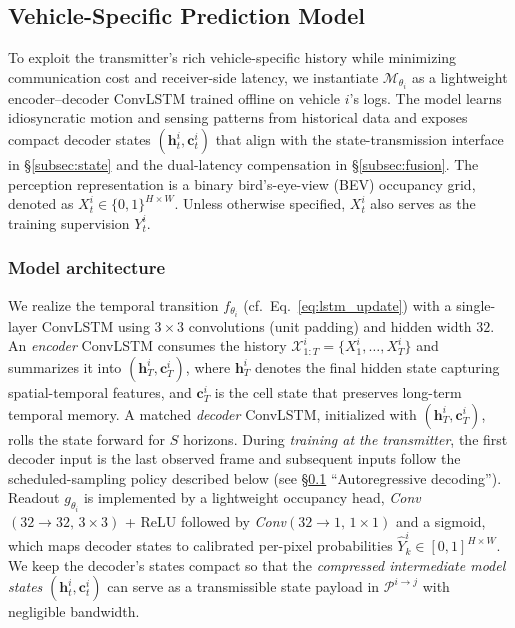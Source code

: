 \subsection{Vehicle-Specific Prediction Model}
\label{subsec:vspm}

To exploit the transmitter’s rich vehicle-specific history while minimizing communication cost and receiver-side latency, we instantiate $\mathcal{M}_{\theta_i}$ as a lightweight encoder--decoder ConvLSTM trained offline on vehicle $i$’s logs. The model learns idiosyncratic motion and sensing patterns from historical data and exposes compact decoder states $(\mathbf{h}^i_t,\mathbf{c}^i_t)$ that align with the state-transmission interface in \S\ref{subsec:state} and the dual-latency compensation in \S\ref{subsec:fusion}. The perception representation is a binary bird’s-eye-view (BEV) occupancy grid, denoted as $X^i_t \in \{0,1\}^{H\times W}$. Unless otherwise specified, $X^i_t$ also serves as the training supervision $Y^i_t$.

\subsubsection{Model architecture}
We realize the temporal transition $f_{\theta_i}$ (cf.\ Eq.~\ref{eq:lstm_update}) with a single-layer ConvLSTM using $3{\times}3$ convolutions (unit padding) and hidden width $32$. 
An \emph{encoder} ConvLSTM consumes the history $\mathcal{X}^i_{1:T}=\{X^i_1,\dots,X^i_T\}$ and summarizes it into $(\mathbf{h}^i_T,\mathbf{c}^i_T)$, 
where $\mathbf{h}^i_T$ denotes the final hidden state capturing spatial-temporal features, and $\mathbf{c}^i_T$ is the cell state that preserves long-term temporal memory.
A matched \emph{decoder} ConvLSTM, initialized with $(\mathbf{h}^i_T,\mathbf{c}^i_T)$, rolls the state forward for $S$ horizons. 
During \emph{training at the transmitter}, the first decoder input is the last observed frame and subsequent inputs follow the scheduled-sampling policy described below (see \S\ref{subsec:vspm} ``Autoregressive decoding''). 
Readout $g_{\theta_i}$ is implemented by a lightweight occupancy head,
\emph{Conv}$(32{\to}32,\,3{\times}3)$ + ReLU followed by \emph{Conv}$(32{\to}1,\,1{\times}1)$ and a sigmoid,
which maps decoder states to calibrated per-pixel probabilities $\widehat{Y}^i_k \in [0,1]^{H\times W}$.
We keep the decoder’s states compact so that the \emph{compressed intermediate model states} $(\mathbf{h}^i_t,\mathbf{c}^i_t)$ can serve as a transmissible state payload in $\mathcal{P}^{i\rightarrow j}$ with negligible bandwidth.

